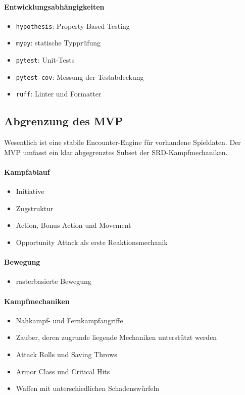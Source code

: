 \documentclass[
  12pt,
  a4paper,
  oneside,
  parskip=half,
  headings=normal
]{scrreprt}
\begin{document}
\paragraph{Entwicklungsabhängigkeiten}
\begin{itemize}
  \item \texttt{hypothesis}: Property-Based Testing
  \item \texttt{mypy}: statische Typprüfung
  \item \texttt{pytest}: Unit-Tests
  \item \texttt{pytest-cov}: Messung der Testabdeckung
  \item \texttt{ruff}: Linter und Formatter
\end{itemize}

\subsection{Abgrenzung des MVP}

Wesentlich ist eine stabile Encounter-Engine für vorhandene Spieldaten. Der
MVP umfasst ein klar abgegrenztes Subset der SRD-Kampfmechaniken.

\paragraph{Kampfablauf}
\begin{itemize}
  \item Initiative
  \item Zugstruktur
  \item Action, Bonus Action und Movement
  \item Opportunity Attack als erste Reaktionsmechanik
\end{itemize}

\paragraph{Bewegung}
\begin{itemize}
  \item rasterbasierte Bewegung
\end{itemize}

\paragraph{Kampfmechaniken}
\begin{itemize}
  \item Nahkampf- und Fernkampfangriffe
  \item Zauber, deren zugrunde liegende Mechaniken unterstützt werden
  \item Attack Rolls und Saving Throws
  \item Armor Class und Critical Hits
  \item Waffen mit unterschiedlichen Schadenswürfeln
\end{itemize}
\end{document}
